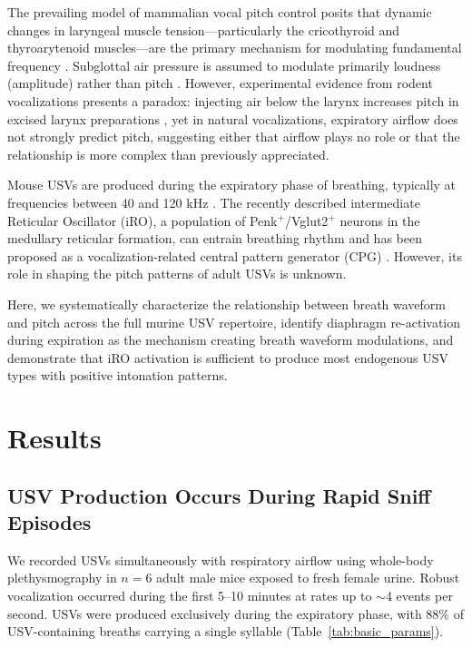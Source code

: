 \documentclass[11pt]{article}
\begin{document}
The prevailing model of mammalian vocal pitch control posits that dynamic changes in laryngeal muscle tension---particularly the cricothyroid and thyroarytenoid muscles---are the primary mechanism for modulating fundamental frequency \citep{titze2008nonlinear, roberts1975laryngeal, nishimura2022cricothyroid}. Subglottal air pressure is assumed to modulate primarily loudness (amplitude) rather than pitch \citep{riede2011subglottal}. However, experimental evidence from rodent vocalizations presents a paradox: injecting air below the larynx increases pitch in excised larynx preparations \citep{riede2013mechanisms}, yet in natural vocalizations, expiratory airflow does not strongly predict pitch, suggesting either that airflow plays no role or that the relationship is more complex than previously appreciated.

Mouse USVs are produced during the expiratory phase of breathing, typically at frequencies between 40 and 120 kHz \citep{grimsley2011temporal, riede2011subglottal}. The recently described intermediate Reticular Oscillator (iRO), a population of Penk$^+$/Vglut2$^+$ neurons in the medullary reticular formation, can entrain breathing rhythm and has been proposed as a vocalization-related central pattern generator (CPG) \citep{castellucci2018breathing, castellucci2022breathing}. However, its role in shaping the pitch patterns of adult USVs is unknown.

Here, we systematically characterize the relationship between breath waveform and pitch across the full murine USV repertoire, identify diaphragm re-activation during expiration as the mechanism creating breath waveform modulations, and demonstrate that iRO activation is sufficient to produce most endogenous USV types with positive intonation patterns.

\section{Results}

\subsection{USV Production Occurs During Rapid Sniff Episodes}

We recorded USVs simultaneously with respiratory airflow using whole-body plethysmography in $n = 6$ adult male mice exposed to fresh female urine. Robust vocalization occurred during the first 5--10 minutes at rates up to $\sim$4 events per second. USVs were produced exclusively during the expiratory phase, with 88\% of USV-containing breaths carrying a single syllable (Table~\ref{tab:basic_params}).
\end{document}
